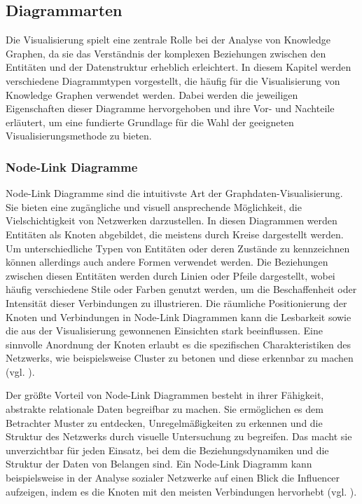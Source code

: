 \subsection{Diagrammarten}
\label{theory:visualization:types}

Die Visualisierung spielt eine zentrale Rolle bei der Analyse von Knowledge Graphen, da sie das Verständnis der komplexen Beziehungen zwischen den Entitäten und der Datenstruktur erheblich erleichtert. In diesem Kapitel werden verschiedene Diagrammtypen vorgestellt, die häufig für die Visualisierung von Knowledge Graphen verwendet werden. Dabei werden die jeweiligen Eigenschaften dieser Diagramme hervorgehoben und ihre Vor- und Nachteile erläutert, um eine fundierte Grundlage für die Wahl der geeigneten Visualisierungsmethode zu bieten.

\subsubsection{Node-Link Diagramme}

Node-Link Diagramme sind die intuitivste Art der Graphdaten-Visualisierung. Sie bieten eine zugängliche und visuell  ansprechende Möglichkeit, die Vielschichtigkeit von Netzwerken darzustellen. In diesen Diagrammen werden Entitäten als Knoten abgebildet, die meistens durch Kreise dargestellt werden. Um unterschiedliche Typen von Entitäten oder deren Zustände zu kennzeichnen können allerdings auch andere Formen verwendet werden. Die Beziehungen zwischen diesen Entitäten werden durch Linien oder Pfeile dargestellt, wobei häufig verschiedene Stile oder Farben genutzt werden, um die Beschaffenheit oder Intensität dieser Verbindungen zu illustrieren. Die räumliche Positionierung der Knoten und Verbindungen in Node-Link Diagrammen kann die Lesbarkeit sowie die aus der Visualisierung gewonnenen Einsichten stark beeinflussen. Eine sinnvolle Anordnung der Knoten erlaubt es die spezifischen Charakteristiken des Netzwerks, wie beispielsweise Cluster zu betonen und diese erkennbar zu machen (vgl. \cite{nodelink:Basics}).

Der größte Vorteil von Node-Link Diagrammen besteht in ihrer Fähigkeit, abstrakte relationale Daten begreifbar zu machen. Sie ermöglichen es dem Betrachter Muster zu entdecken, Unregelmäßigkeiten zu erkennen und die Struktur des Netzwerks durch visuelle Untersuchung zu begreifen. Das macht sie unverzichtbar für jeden Einsatz, bei dem die Beziehungsdynamiken und die Struktur der Daten von Belangen sind. Ein Node-Link Diagramm kann beispielsweise in der Analyse sozialer Netzwerke auf einen Blick die Influencer aufzeigen, indem es die Knoten mit den meisten Verbindungen hervorhebt (vgl. \cite{nodelink:Basics}).

